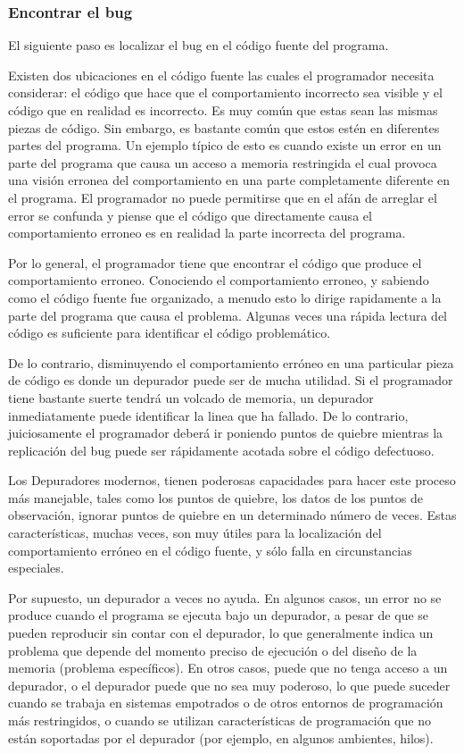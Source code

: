 \documentclass[12pt,legalpaper]{report}
\begin{document}
\subsubsection{Encontrar el bug}

El siguiente paso es localizar el bug en el código fuente del programa.

Existen dos ubicaciones en el código fuente las cuales el programador necesita considerar: el código que hace que el comportamiento incorrecto sea visible y el código que en realidad es incorrecto.  Es muy común que estas sean las mismas piezas de código.  Sin embargo, es bastante común que estos estén en diferentes partes del programa.  Un ejemplo típico de esto es cuando existe un error en un parte del programa que causa un acceso a memoria restringida el cual provoca una visión erronea del comportamiento en una parte completamente diferente en el programa.  El programador no puede permitirse que en el afán de arreglar el error se confunda y piense que el código que directamente causa el comportamiento erroneo es en realidad la parte incorrecta del programa.

Por lo general, el programador tiene que encontrar el código que produce el comportamiento erroneo.  Conociendo el comportamiento erroneo, y sabiendo como el código fuente fue organizado, a menudo esto lo dirige rapidamente a la parte del programa que causa el problema.  Algunas veces una rápida lectura del código es suficiente para identificar el código problemático.

De lo contrario, disminuyendo el comportamiento erróneo en una particular pieza de código es donde un depurador puede ser de mucha utilidad.  Si el programador tiene bastante suerte tendrá un volcado de memoria, un depurador inmediatamente puede identificar la linea que ha fallado.  De lo contrario, juiciosamente el programador deberá ir poniendo puntos de quiebre mientras la replicación del bug puede ser rápidamente acotada sobre el código defectuoso.

Los Depuradores modernos, tienen poderosas capacidades para hacer este proceso más manejable, tales como los puntos de quiebre, los datos de los puntos de observación, ignorar puntos de quiebre en un determinado número de veces.  Estas características, muchas veces, son muy útiles para la localización del comportamiento erróneo en el código fuente, y sólo falla en circunstancias especiales.

Por supuesto, un depurador a veces no ayuda. En algunos casos, un error no se produce cuando el programa se ejecuta bajo un depurador, a pesar de que se pueden reproducir sin contar con el depurador, lo que generalmente indica un problema que depende del momento preciso de ejecución o del diseño de la memoria (problema específicos). En otros casos, puede que no tenga acceso a un depurador, o el depurador puede que no sea muy poderoso, lo que puede suceder cuando se trabaja en sistemas empotrados o de otros entornos de programación más restringidos, o cuando se utilizan características de programación que no están soportadas por el depurador (por ejemplo, en algunos ambientes, hilos).
\end{document}
